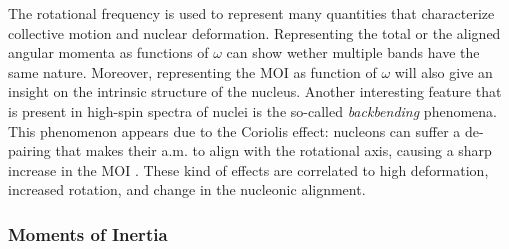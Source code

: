 The rotational frequency is used to represent many quantities that characterize collective motion and nuclear deformation. Representing the total or the aligned angular momenta as functions of $\omega$ can show wether multiple bands have the same nature. Moreover, representing the MOI as function of $\omega$ will also give an insight on the intrinsic structure of the nucleus. Another interesting feature that is present in high-spin spectra of nuclei is the so-called \emph{backbending} phenomena. This phenomenon appears due to the Coriolis effect: nucleons can suffer a de-pairing that makes their a.m. to align with the rotational axis, causing a sharp increase in the MOI \cite{ring2004nuclear,kvasil2004backbending}. These kind of effects are correlated to high deformation, increased rotation, and change in the nucleonic alignment.

\subsubsection{Moments of Inertia}

